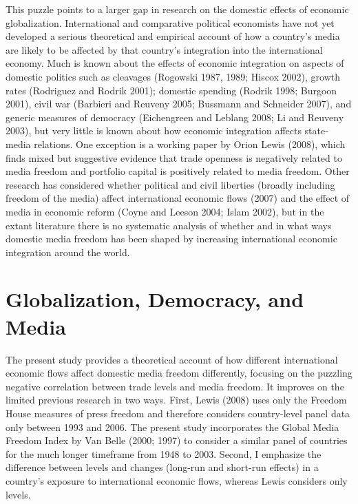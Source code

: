 \documentclass[a4paper]{article}\usepackage[]{graphicx}\usepackage[]{color}
\begin{document}
This puzzle points to a larger gap in research on the domestic effects of economic globalization. International and comparative political economists have not yet developed a serious theoretical and empirical account of how a country's media are likely to be affected by that country's integration into the international economy. Much is known about the effects of economic integration on aspects of domestic politics such as cleavages (Rogowski 1987, 1989; Hiscox 2002), growth rates (Rodriguez and Rodrik 2001); domestic spending (Rodrik 1998; Burgoon 2001), civil war (Barbieri and Reuveny 2005; Bussmann and Schneider 2007), and generic measures of democracy (Eichengreen and Leblang 2008; Li and Reuveny 2003), but very little is known about how economic integration affects state-media relations. One exception is a working paper by Orion Lewis (2008), which finds mixed but suggestive evidence that trade openness is negatively related to media freedom and portfolio capital is positively related to media freedom. Other research has considered whether political and civil liberties (broadly including freedom of the media) affect international economic flows (2007) and the effect of media in economic reform (Coyne and Leeson 2004; Islam 2002), but in the extant literature there is no systematic analysis of whether and in what ways domestic media freedom has been shaped by increasing international economic integration around the world.

\section{Globalization, Democracy, and Media}

The present study provides a theoretical account of how different international economic flows affect domestic media freedom differently, focusing on the puzzling negative correlation between trade levels and media freedom. It improves on the limited previous research in two ways. First, Lewis (2008) uses only the Freedom House measures of press freedom and therefore considers country-level panel data only between 1993 and 2006. The present study incorporates the Global Media Freedom Index by Van Belle (2000; 1997) to consider a similar panel of countries for the much longer timeframe from 1948 to 2003. Second, I emphasize the difference between levels and changes (long-run and short-run effects) in a country's exposure to international economic flows, whereas Lewis considers only levels.
\end{document}
